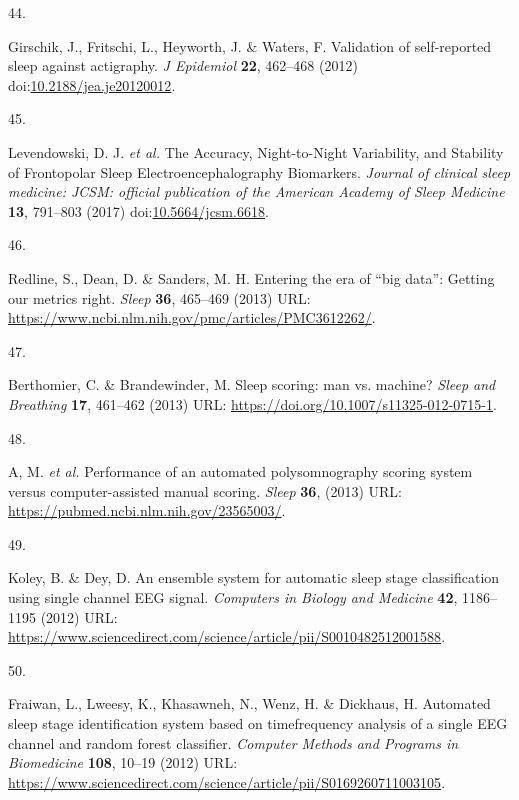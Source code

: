 \documentclass[
  10pt,
]{scrbook}
\newlength{\cslhangindent}
\newlength{\csllabelwidth}
\newlength{\cslentryspacingunit} %
\newenvironment{CSLReferences}[2] %
 {%
  \setlength{\parindent}{0pt}
  \ifodd #1
  \let\oldpar\par
  \def\par{\hangindent=\cslhangindent\oldpar}
  \fi
  \setlength{\parskip}{#2\cslentryspacingunit}
 }%
 {}
\newcommand{\CSLLeftMargin}[1]{\parbox[t]{\csllabelwidth}{#1}}
\newcommand{\CSLRightInline}[1]{\parbox[t]{\linewidth - \csllabelwidth}{#1}\break}
\begin{document}
\begin{CSLReferences}{0}{0}
\leavevmode{}%
\CSLLeftMargin{44. }%
\CSLRightInline{Girschik, J., Fritschi, L., Heyworth, J. \& Waters, F.
Validation of self-reported sleep against actigraphy. \emph{J Epidemiol}
\textbf{22}, 462--468 (2012)
doi:\href{https://doi.org/10.2188/jea.je20120012}{10.2188/jea.je20120012}.}

\leavevmode{}%
\CSLLeftMargin{45. }%
\CSLRightInline{Levendowski, D. J. \emph{et al.} The Accuracy,
Night-to-Night Variability, and Stability of Frontopolar Sleep
Electroencephalography Biomarkers. \emph{Journal of clinical sleep
medicine: JCSM: official publication of the American Academy of Sleep
Medicine} \textbf{13}, 791--803 (2017)
doi:\href{https://doi.org/10.5664/jcsm.6618}{10.5664/jcsm.6618}.}

\leavevmode{}%
\CSLLeftMargin{46. }%
\CSLRightInline{Redline, S., Dean, D. \& Sanders, M. H. Entering the era
of {``}big data{''}: Getting our metrics right. \emph{Sleep}
\textbf{36}, 465--469 (2013) URL:
\url{https://www.ncbi.nlm.nih.gov/pmc/articles/PMC3612262/}.}

\leavevmode{}%
\CSLLeftMargin{47. }%
\CSLRightInline{Berthomier, C. \& Brandewinder, M. Sleep scoring: man
vs. machine? \emph{Sleep and Breathing} \textbf{17}, 461--462 (2013)
URL: \url{https://doi.org/10.1007/s11325-012-0715-1}.}

\leavevmode{}%
\CSLLeftMargin{48. }%
\CSLRightInline{A, M. \emph{et al.} Performance of an automated
polysomnography scoring system versus computer-assisted manual scoring.
\emph{Sleep} \textbf{36}, (2013) URL:
\url{https://pubmed.ncbi.nlm.nih.gov/23565003/}.}

\leavevmode{}%
\CSLLeftMargin{49. }%
\CSLRightInline{Koley, B. \& Dey, D. An ensemble system for automatic
sleep stage classification using single channel EEG signal.
\emph{Computers in Biology and Medicine} \textbf{42}, 1186--1195 (2012)
URL:
\url{https://www.sciencedirect.com/science/article/pii/S0010482512001588}.}

\leavevmode{}%
\CSLLeftMargin{50. }%
\CSLRightInline{Fraiwan, L., Lweesy, K., Khasawneh, N., Wenz, H. \&
Dickhaus, H. Automated sleep stage identification system based on
time{\textendash}frequency analysis of a single EEG channel and random
forest classifier. \emph{Computer Methods and Programs in Biomedicine}
\textbf{108}, 10--19 (2012) URL:
\url{https://www.sciencedirect.com/science/article/pii/S0169260711003105}.}


\end{CSLReferences}
\end{document}
